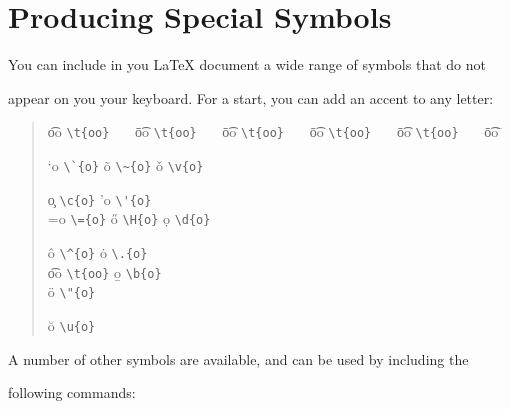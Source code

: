 \section{Producing Special Symbols}



You can include in you \LaTeX{} document a wide range of symbols that do not

appear on you your keyboard. For a start, you can add an accent to any letter:

\begin{quote}\begin{tabbing}



\t{oo} \= \verb|\t{oo}|~~~ \=

\t{oo} \= \verb|\t{oo}|~~~ \=

\t{oo} \= \verb|\t{oo}|~~~ \=

\t{oo} \= \verb|\t{oo}|~~~ \=

\t{oo} \= \verb|\t{oo}|~~~ \=

\t{oo} \=                       \kill



\a`{o} \> \verb|\`{o}|  \> \~{o}  \> \verb|\~{o}|  \> \v{o}  \> \verb|\v{o}| \>

\c{o}  \> \verb|\c{o}|  \> \a'{o} \> \verb|\'{o}|  \\

\a={o} \> \verb|\={o}|  \> \H{o}  \> \verb|\H{o}|  \> \d{o}  \> \verb|\d{o}| \>

\^{o}  \> \verb|\^{o}|  \> \.{o}  \> \verb|\.{o}|  \\

\t{oo} \> \verb|\t{oo}| \> \b{o}  \> \verb|\b{o}|  \\  \"{o} \> \verb|\"{o}| \>

\u{o}  \> \verb|\u{o}|  \\

\end{tabbing}\end{quote}



A number of other symbols are available, and can be used by including the

following commands:

